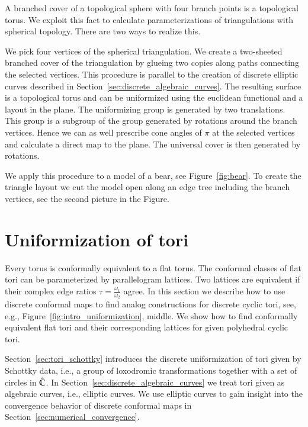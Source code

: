 \documentclass[Thesis]{subfiles}
\begin{document}
A branched cover of a topological sphere with four branch points is a topological torus.
We exploit this fact to calculate parameterizations of triangulations with spherical topology.
There are two ways to realize this.

We pick four vertices of the spherical triangulation. We create a two-sheeted branched cover of the triangulation by glueing two copies along paths connecting the selected vertices.
This procedure is parallel to the creation of discrete elliptic curves described in Section~\ref{sec:discrete_algebraic_curves}.
The resulting surface is a topological torus and can be uniformized using the euclidean functional and a layout in the plane.
The uniformizing group is generated by two translations.
This group is a subgroup of the group generated by rotations around the branch vertices.
Hence we can as well prescribe cone angles of $\pi$ at the selected vertices and calculate a direct map to the plane.
The universal cover is then generated by rotations.

We apply this procedure to a model of a bear, see Figure~\ref{fig:bear}. To create the triangle layout we cut the model open along an edge tree including the branch vertices, see the second picture in the Figure.

\section{Uniformization of tori}
\label{sec:tori}

Every torus is conformally equivalent to a flat torus.
The conformal classes of flat tori can be parameterized by parallelogram lattices. 
Two lattices are equivalent if their complex edge ratios $\tau = \frac{\omega_1}{\omega_2}$ agree.
In this section we describe how to use discrete conformal maps to find analog constructions for discrete cyclic tori, see, e.g., Figure~\ref{fig:intro_uniformization}, middle. 
We show how to find conformally equivalent flat tori and their corresponding lattices for given polyhedral cyclic tori.

Section~\ref{sec:tori_schottky} introduces the discrete uniformization of tori given by Schottky data, i.e., a group of loxodromic transformations together with a set of circles in $\hat{\mathbb C}$. 
In Section~\ref{sec:discrete_algebraic_curves} we treat tori given as algebraic curves, i.e., elliptic curves. 
We use elliptic curves to gain insight into the convergence behavior of discrete conformal maps in Section~\ref{sec:numerical_convergence}.
\end{document}
